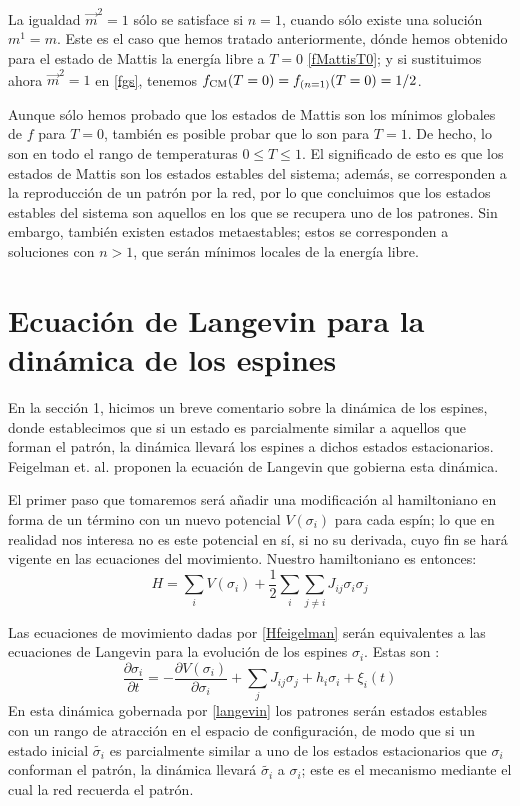 \documentclass[titlepage,12pt]{article}
\numberwithin{equation}{section}
\begin{document}
	La igualdad $\vec{m}^2=1$ sólo se satisface si $n=1$, cuando sólo existe una solución $m^1=m$. Este es el caso que hemos tratado anteriormente, dónde hemos obtenido para el estado de Mattis la energía libre a $T=0$ \eqref{fMattisT0}; y si sustituimos ahora $\vec{m}^2=1$ en \eqref{fgs}, tenemos $f_{\textnormal{CM}}(T=0)=f_{(n=1)}(T=0)=1/2$.
	
	Aunque sólo hemos probado que los estados de Mattis son los mínimos globales de $f$ para $T=0$, también es posible probar que lo son para $T=1$. De hecho, lo son en todo el rango de temperaturas $0\leq T\leq1$. El significado de esto es que los estados de Mattis son los estados estables del sistema; además, se corresponden a la reproducción de un patrón por la red, por lo que concluimos que los estados estables del sistema son aquellos en los que se recupera uno de los patrones. Sin embargo, también existen estados metaestables; estos se corresponden a soluciones con $n>1$, que serán mínimos locales de la energía libre.
	\section{Ecuación de Langevin para la dinámica de los espines}
	En la sección 1, hicimos un breve comentario sobre la dinámica de los espines, donde establecimos que si un estado es parcialmente similar a aquellos que forman el patrón, la dinámica llevará los espines a dichos estados estacionarios. Feigelman et. al. \cite{feigelman86} proponen la ecuación de Langevin que gobierna esta dinámica. 
	
	El primer paso que tomaremos será añadir una modificación al hamiltoniano en forma de un término con un nuevo potencial $V(\sigma_i)$ para cada espín; lo que en realidad nos interesa no es este potencial en sí, si no su derivada, cuyo fin se hará vigente en las ecuaciones del movimiento. Nuestro hamiltoniano es entonces:
	\begin{equation}
	H = \sum_i V(\sigma_i) + \frac{1}{2}\sum_{i}\sum_{j\neq i}J_{ij}\sigma_i\sigma_j
	\label{Hfeigelman}
	\end{equation}
	
	Las ecuaciones de movimiento dadas por \eqref{Hfeigelman} serán equivalentes a las ecuaciones de Langevin para la evolución de los espines $\sigma_i$. Estas son \cite{feigelman86}:
	\begin{equation}
	\frac{\partial\sigma_i}{\partial t} = -\frac{\partial V(\sigma_i)}{\partial\sigma_i} + \sum_j J_{ij}\sigma_j + h_i\sigma_i + \xi_i(t)
	\label{langevin}
	\end{equation}
	En esta dinámica gobernada por \eqref{langevin} los patrones serán estados estables con un rango de atracción en el espacio de configuración, de modo que si un estado inicial $\tilde{\sigma_i}$ es parcialmente similar a uno de los estados estacionarios que $\sigma_i$ conforman el patrón, la dinámica llevará $\tilde{\sigma_i}$ a $\sigma_i$; este es el mecanismo mediante el cual la red recuerda el patrón.\\
	
\end{document}
